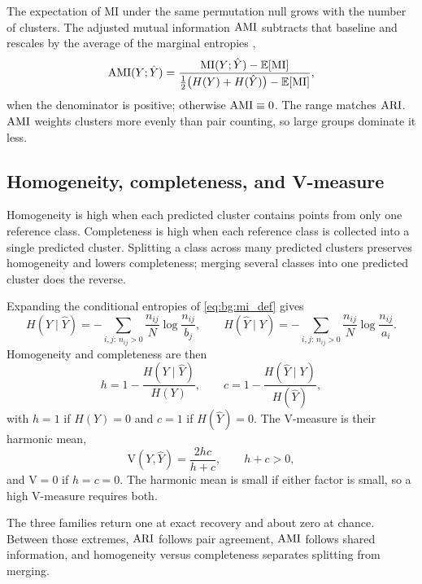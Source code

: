 The expectation of $\mathrm{MI}$ under the same permutation null grows with the number of clusters.
The adjusted mutual information $\mathrm{AMI}$ subtracts that baseline and rescales by the average of the marginal entropies \parencite{vinh2010information},
\begin{equation}\label{eq:bg:ami}
  \mathrm{AMI}(Y;\hat{Y})
  =
  \frac{\mathrm{MI}(Y;\hat{Y})-\mathbb{E}[\mathrm{MI}]}{\tfrac{1}{2}\bigl(H(Y)+H(\hat{Y})\bigr)-\mathbb{E}[\mathrm{MI}]},
\end{equation}
when the denominator is positive; otherwise $\mathrm{AMI}\equiv 0$.
The range matches $\mathrm{ARI}$.
$\mathrm{AMI}$ weights clusters more evenly than pair counting, so large groups dominate it less.

\subsection*{Homogeneity, completeness, and V-measure}

Homogeneity is high when each predicted cluster contains points from only one reference class.
Completeness is high when each reference class is collected into a single predicted cluster.
Splitting a class across many predicted clusters preserves homogeneity and lowers completeness; merging several classes into one predicted cluster does the reverse.

Expanding the conditional entropies of \cref{eq:bg:mi_def} gives
\begin{equation}\label{eq:bg:cond_ent}
  H(Y\mid \hat{Y})=-\sum_{i,j:\,n_{ij}>0}\frac{n_{ij}}{N}\log\frac{n_{ij}}{b_j},
  \qquad
  H(\hat{Y}\mid Y)=-\sum_{i,j:\,n_{ij}>0}\frac{n_{ij}}{N}\log\frac{n_{ij}}{a_i}.
\end{equation}
Homogeneity and completeness are then \parencite{rosenberg2007v}
\begin{equation}\label{eq:bg:vmeasure_hc}
  h = 1-\frac{H(Y\mid \hat{Y})}{H(Y)},
  \qquad
  c = 1-\frac{H(\hat{Y}\mid Y)}{H(\hat{Y})},
\end{equation}
with $h=1$ if $H(Y)=0$ and $c=1$ if $H(\hat{Y})=0$.
The V-measure is their harmonic mean,
\begin{equation}\label{eq:bg:vmeasure}
  \mathrm{V}(Y,\hat{Y})=\frac{2hc}{h+c},
  \qquad h+c>0,
\end{equation}
and $\mathrm{V}=0$ if $h=c=0$.
The harmonic mean is small if either factor is small, so a high V-measure requires both.

The three families return one at exact recovery and about zero at chance.
Between those extremes, $\mathrm{ARI}$ follows pair agreement, $\mathrm{AMI}$ follows shared information, and homogeneity versus completeness separates splitting from merging.

